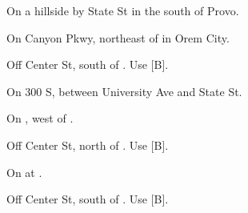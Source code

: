 

\begin{LocationList}

On a hillside by  State St in the south of Provo.

On  Canyon Pkwy, northeast of   in Orem City.

Off Center St, south of . Use  [B].

On  300 S, between University Ave and State St.

On , west of  .

Off Center St, north of . Use  [B].

\Location{\TruckStop \Gas \Rest}
On  at .

Off Center St, south of . Use  [B].

\end{LocationList}
